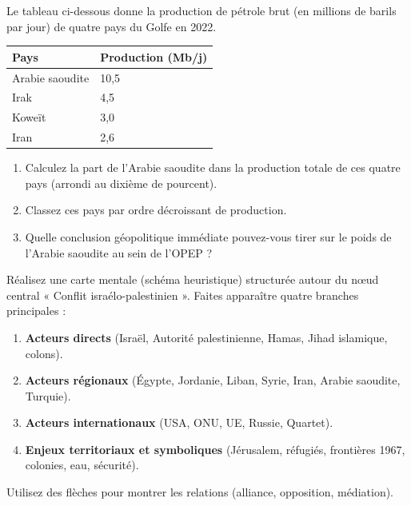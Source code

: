 \documentclass[11pt]{article}
\newcounter{popsec}
\newcounter{popsub}
\newcommand{\courssub}[1]{%
  \stepcounter{popsub}%
  \par\vspace{9pt}\noindent{\popxbold\fontsize{11.5}{13}\selectfont\color{popink}{\color{poporange}\thepopsec.\thepopsub}\hspace{6pt}#1}\par\nopagebreak\vspace{4pt}
}
\begin{document}
\begin{exercice}
Le tableau ci-dessous donne la production de pétrole brut (en millions de barils par jour) de quatre pays du Golfe en 2022.
\begin{center}
\begin{tabularx}{\linewidth}{|l|X|}\hline
\textbf{Pays} & \textbf{Production (Mb/j)} \\ \hline
Arabie saoudite & 10,5 \\ \hline
Irak & 4,5 \\ \hline
Koweït & 3,0 \\ \hline
Iran & 2,6 \\ \hline
\end{tabularx}
\end{center}
\begin{enumerate}
    \item Calculez la part de l'Arabie saoudite dans la production totale de ces quatre pays (arrondi au dixième de pourcent).
    \item Classez ces pays par ordre décroissant de production.
    \item Quelle conclusion géopolitique immédiate pouvez-vous tirer sur le poids de l'Arabie saoudite au sein de l'OPEP ?
\end{enumerate}
\end{exercice}

\courssub{Je m'entraîne}

\begin{exercice}
Réalisez une carte mentale (schéma heuristique) structurée autour du nœud central « Conflit israélo-palestinien ». Faites apparaître quatre branches principales :
\begin{enumerate}
    \item \textbf{Acteurs directs} (Israël, Autorité palestinienne, Hamas, Jihad islamique, colons).
    \item \textbf{Acteurs régionaux} (Égypte, Jordanie, Liban, Syrie, Iran, Arabie saoudite, Turquie).
    \item \textbf{Acteurs internationaux} (USA, ONU, UE, Russie, Quartet).
    \item \textbf{Enjeux territoriaux et symboliques} (Jérusalem, réfugiés, frontières 1967, colonies, eau, sécurité).
\end{enumerate}
Utilisez des flèches pour montrer les relations (alliance, opposition, médiation).
\end{exercice}
\end{document}

